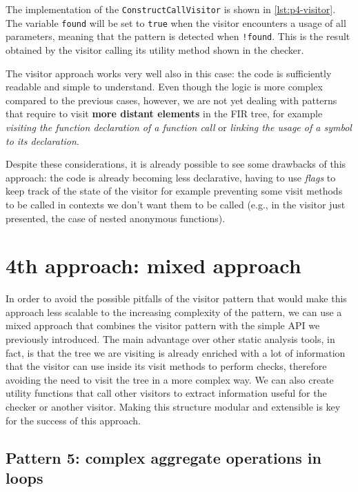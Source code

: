\documentclass[12pt,a4paper,openright,twoside]{book}
\begin{document}
The implementation of the \lstinline{ConstructCallVisitor} is shown in
\cref{lst:p4-visitor}. The variable \lstinline{found} will be set to
\lstinline{true} when the visitor encounters a usage of all parameters, meaning
that the pattern is detected when \lstinline{!found}. This is the result
obtained by the visitor calling its utility method shown in the checker. 



The visitor approach works very well also in this case: the code is sufficiently
readable and simple to understand. Even though the logic is more complex
compared to the previous cases, however, we are not yet dealing with patterns
that require to visit \textbf{more distant elements} in the \ac{FIR} tree, for
example \emph{visiting the function declaration of a function call} or
\emph{linking the usage of a symbol to its declaration}. 

Despite these considerations, it is already possible to see some drawbacks of
this approach: the code is already becoming less declarative, having to use
\emph{flags} to keep track of the state of the visitor for example preventing
some visit methods to be called in contexts we don't want them to be called
(e.g., in the visitor just presented, the case of nested anonymous functions). 

\section{4th approach: mixed approach}

In order to avoid the possible pitfalls of the visitor pattern that would make
this approach less scalable to the increasing complexity of the pattern, we can
use a mixed approach that combines the visitor pattern with the simple API we
previously introduced. The main advantage over other static analysis tools, in
fact, is that the tree we are visiting is already enriched with a lot of
information that the visitor can use inside its visit methods to perform checks,
therefore avoiding the need to visit the tree in a more complex way.
%
We can also create utility functions that call other visitors to extract
information useful for the checker or another visitor. Making this structure 
modular and extensible is key for the success of this approach.

\subsection{Pattern 5: complex aggregate operations in loops} \label{sec:p5}
\end{document}

